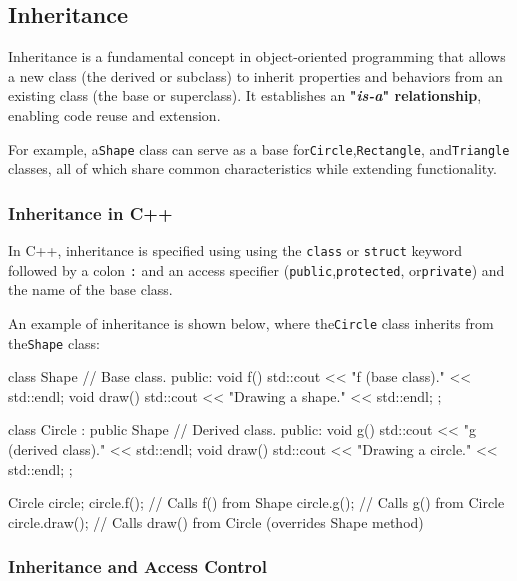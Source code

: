 \subsection{Inheritance}

Inheritance is a fundamental concept in object-oriented programming that allows a new class (the derived or subclass) to inherit properties and behaviors from an existing class (the base or superclass). It establishes an \textbf{"\textit{is-a}" relationship}, enabling code reuse and extension.

For example, a\texttt{Shape} class can serve as a base for\texttt{Circle},\texttt{Rectangle}, and\texttt{Triangle} classes, all of which share common characteristics while extending functionality.

\subsubsection{Inheritance in C++}

In C++, inheritance is specified using using the \texttt{class} or \texttt{struct} keyword followed by a colon \texttt{:} and an access specifier (\texttt{public},\texttt{protected}, or\texttt{private}) and the name of the base class.

\begin{exampleblock}[Inheritance]

    An example of inheritance is shown below, where the\texttt{Circle} class inherits from the\texttt{Shape} class:

\begin{codeblock}[language=C++]
class Shape { // Base class.
public:
    void f() { std::cout << "f (base class)." << std::endl; }
    void draw() { std::cout << "Drawing a shape." << std::endl; }
};

class Circle : public Shape { // Derived class.
public:
    void g() { std::cout << "g (derived class)." << std::endl; }
    void draw() { std::cout << "Drawing a circle." << std::endl; }
};

Circle circle;
circle.f();    // Calls f() from Shape
circle.g();    // Calls g() from Circle
circle.draw(); // Calls draw() from Circle (overrides Shape method)
\end{codeblock}
\end{exampleblock}

\subsubsection{Inheritance and Access Control}

